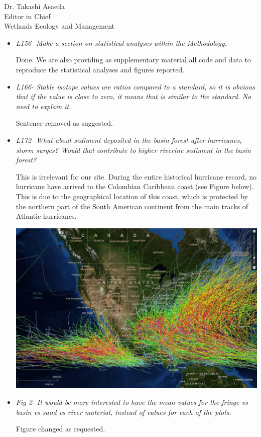 \documentclass[11pt]{bgcletter}
\begin{document}
\begin{letter}{Dr. Takashi Asaeda\\
 Editor in Chief \\ Wetlands Ecology and Management}
\begin{itemize}
{\color{blue} Done.}

\item {\it L156- Make a section on statistical analyses within the Methodology. }

{\color{blue} Done. We are also providing as supplementary material all code and data to reproduce the statistical analyses and figures reported.}

\item {\it L166- Stable isotope values are ratios compared to a standard, so it is obvious that if the value is close to zero, it means that is similar to the standard. No need to explain it. }

{\color{blue} Sentence removed as suggested.}

\item {\it L172- What about sediment deposited in the basin forest after hurricanes, storm surges? Would that contribute to higher riverine sediment in the basin forest? }

{\color{blue} This is irrelevant for our site. During the entire historical hurricane record, no hurricane have arrived to the Colombian Caribbean coast (see Figure below). This is due to the geographical location of this coast, which is protected by the northern part of the South American continent from the main tracks of Atlantic hurricanes. }

\includegraphics[scale=0.15]{noaa-hurricane-tracker.jpg}

\item {\it Fig 2- It would be more interested to have the mean values for the fringe vs basin vs sand vs river material, instead of values for each of the plots. }

{\color{blue} Figure changed as requested.}


\end{itemize}
\end{letter}
\end{document}
